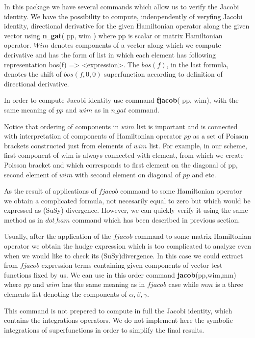 In this package we have several commands which allow us to
verify the Jacobi identity.
We have the possibility to compute, indenpendently  of veryfing Jacobi
identity, directional derivative for the given Hamiltonian operator along
the given vector using
\be
                {\bf n\underline{~}gat}( pp, wim )
\ee
where pp is scalar or matrix Hamiltonian operator. $ Wim $  denotes
components of a vector along which we compute derivative and has the
form of list in which each element has following representation
\be
        bos(f) => <expression>.
\ee
The $ bos(f) $, in the last formula, denotes the shift of  $ bos(f,0,0) $
superfunction according to definition of directional derivative.

In order to compute Jacobi identity use command
\be
        {\bf fjacob}( pp, wim),
\ee
with the same meaning of $pp$ and $wim$ as in $n\underline{~}gat$ command.

Notice that ordering of components in  $wim$ list is important and
is connected with interpretation of components of Hamiltonian operator
$pp$ as a set of Poisson brackets constructed just from elements of $ wim $
list.
For example, in our scheme, first component of wim is always connected
with element, from which we create  Poisson bracket and  which
corresponds to first element on the diagonal of pp, second element of
$ wim $ with second element on diagonal of $pp$ and etc.

As the result of applications of $ fjacob $ command to some Hamiltonian
operator we obtain a complicated formula, not necesarily equal to zero but
which would be expressed as (SuSy) divergence. However, we can quickly
verify it using the same method as in $ dot\underline{~}ham $ command
which has been described in previous section.

Usually, after the application of the $ fjacob $  command to some matrix
Hamiltonian operator we obtain the hudge expression which is too complicated
to analyze even when we would like to check its (SuSy)divergence. In this case
we could extract from $fjacob$ expression terms containing given
components of vector test functions fixed by us. We can use in this
order command
\be
                {\bf jacob}(pp,wim,mm)
\ee
where $ pp $ and $ wim $ has the same meaning as in $ fjacob $ case while
$ mm $ is a three elements list denoting the components of
${\alpha,\beta,\gamma}$.

This command is not prepered to compute in full the Jacobi identity,
which contains the integrations operators. We do not implement here the
symbolic integrations of superfunctions in order to simplify the final results.
\newpage


